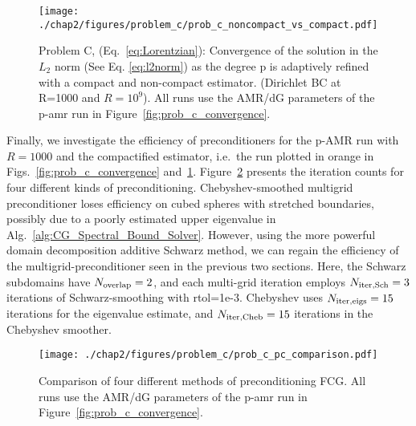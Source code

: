 \begin{figure}[ht!]
  \centering
  \texttt{[image: ./chap2/figures/problem\_c/prob\_c\_noncompact\_vs\_compact.pdf]}
  \caption{ \label{fig:prob_c_noncompact_vs_compact} Problem C,
    (Eq.~\ref{eq:Lorentzian}): Convergence of the solution in the
    $L_2$ norm (See Eq. \ref{eq:l2norm}) as the degree p is adaptively
    refined with a compact and non-compact estimator.  (Dirichlet BC
    at R=1000 and $R=10^9$).  All runs use the AMR/dG parameters of
    the p-amr run in Figure~\ref{fig:prob_c_convergence}.  }
\end{figure}


Finally, we investigate the efficiency of preconditioners for the
p-AMR run with $R=1000$ and the compactified estimator, i.e.\ the run plotted in orange in Figs.~\ref{fig:prob_c_convergence}
  and~\ref{fig:prob_c_noncompact_vs_compact}.
Figure~\ref{fig:prob_c_pc_comparison} presents the iteration counts
for four different kinds of preconditioning.
Chebyshev-smoothed multigrid
preconditioner loses
  efficiency on cubed spheres with stretched boundaries, possibly due
to a poorly estimated upper eigenvalue in
Alg.~\ref{alg:CG_Spectral_Bound_Solver}. However, using the more
powerful domain decomposition additive Schwarz method, we can regain
the efficiency of the multigrid-preconditioner seen in the previous
two sections.  Here, the Schwarz subdomains have $N_{\rm
    overlap}=2$, and each multi-grid iteration employs $N_{\rm iter,
    Sch}=3$ iterations of Schwarz-smoothing with rtol=1e-3.  Chebyshev
  uses $N_{\rm iter,eigs}=15$ iterations for the eigenvalue estimate,
  and $N_{\rm iter,Cheb}=15$ iterations in the Chebyshev smoother.


\begin{figure}[ht!]
  \centering
  \texttt{[image: ./chap2/figures/problem\_c/prob\_c\_pc\_comparison.pdf]}
  \caption{ \label{fig:prob_c_pc_comparison} Comparison of four
    different methods of preconditioning FCG.  All runs use the AMR/dG
    parameters of the p-amr run in
    Figure~\ref{fig:prob_c_convergence}.
  }
\end{figure}



